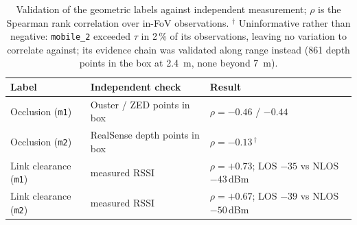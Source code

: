 \begin{table}[t]
\centering
\caption{Validation of the geometric labels against independent measurement;
$\rho$ is the Spearman rank correlation over in-FoV observations.
$^\dagger$ Uninformative rather than negative: \texttt{mobile\_2} exceeded
$\tau$ in 2\,\% of its observations, leaving no variation to correlate against;
its evidence chain was validated along range instead (\num{861} depth points in
the box at \SI{2.4}{\metre}, none beyond \SI{7}{\metre}).}
\label{tab:validation}
\small
\begin{tabular}{@{}lll@{}}
\toprule
Label & Independent check & Result \\
\midrule
Occlusion (\texttt{m1}) & Ouster / ZED points in box & $\rho = -0.46$ / $-0.44$ \\
Occlusion (\texttt{m2}) & RealSense depth points in box & $\rho = -0.13$\,$^\dagger$ \\
Link clearance (\texttt{m1}) & measured RSSI & $\rho = +0.73$; LOS $-35$ vs NLOS $-43$\,dBm \\
Link clearance (\texttt{m2}) & measured RSSI & $\rho = +0.67$; LOS $-39$ vs NLOS $-50$\,dBm \\
\bottomrule
\end{tabular}
\end{table}
